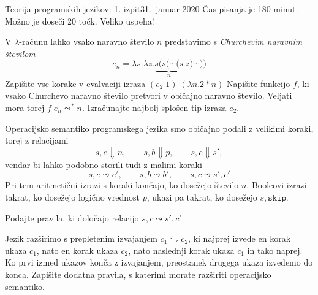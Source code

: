 \documentclass[arhiv]{izpit}
\begin{document}
\newcommand{\bnfis}{\mathrel{{:}{:}{=}}}
\newcommand{\bnfor}{\;\mid\;}
\newcommand{\fun}[2]{\lambda #1. #2}
\newcommand{\conditional}[3]{\mathtt{if}\;#1\;\mathtt{then}\;#2\;\mathtt{else}\;#3}
\newcommand{\whileloop}[2]{\mathtt{while}\;#1\;\mathtt{do}\;#2}
\newcommand{\interleave}[2]{#1 \leftrightharpoons #2}
\newcommand{\recfun}[3]{\mathtt{rec}\;\mathtt{fun}\;#1\;#2. #3}
\newcommand{\boolty}{\mathtt{bool}}
\newcommand{\funty}[2]{#1 \to #2}
\newcommand{\tru}{\mathtt{true}}
\newcommand{\fls}{\mathtt{false}}
\newcommand{\tbool}{\mathtt{bool}}
\newcommand{\tand}{\mathbin{\mathtt{and}}}
\newcommand{\tandalso}{\mathbin{\mathtt{andalso}}}

\izpit
  {Teorija programskih jezikov: 1. izpit}{31.\ januar 2020}{
  Čas pisanja je 180 minut. Možno je doseči 20 točk. Veliko uspeha!
}


\naloga[\tocke{20}]
V $\lambda$-računu lahko vsako naravno število $n$ predstavimo s \emph{Churchevim naravnim številom}
\[
  e_n = \fun{s} \fun{z} \underbrace{s (s (\cdots (s}_n \; z) \cdots))
\]
\podnaloga Zapišite vse korake v evalvaciji izraza $(e_2 \; 1) \; (\fun{n} 2 * n)$ \prostor
\podnaloga Napišite funkcijo $f$, ki vsako Churchevo naravno število pretvori v običajno naravno število. Veljati mora torej $f \; e_n \leadsto^* n$. \prostor
\podnaloga Izračunajte najbolj splošen tip izraza $e_2$. \prostor


\naloga[\tocke{20}]
\newcommand{\skp}{\mathtt{skip}}
Operacijsko semantiko programskega jezika {\imp} smo običajno podali z velikimi koraki, torej z relacijami
\[
  s, e \Downarrow n, \qquad s, b \Downarrow p, \qquad s, c \Downarrow s',
\]
vendar bi lahko podobno storili tudi z malimi koraki
\[
  s, e \leadsto e', \qquad s, b \leadsto b', \qquad s, c \leadsto s', c'
\]
Pri tem aritmetični izrazi s koraki končajo, ko dosežejo število $n$, Booleovi izrazi takrat, ko dosežejo logično vrednost $p$, ukazi pa takrat, ko dosežejo $s, \skp$.

\podnaloga Podajte pravila, ki določajo relacijo $s, c \leadsto s', c'$.

\podnaloga Jezik {\imp} razširimo s prepletenim izvajanjem $\interleave{c_1}{c_2}$, ki najprej izvede en korak ukaza $c_1$, nato en korak ukaza $c_2$, nato naslednji korak ukaza $c_1$ in tako naprej. Ko prvi izmed ukazov konča z izvajanjem, preostanek drugega ukaza izvedemo do konca. Zapišite dodatna pravila, s katerimi morate razširiti operacijsko semantiko.
\prostor[2]
\end{document}
